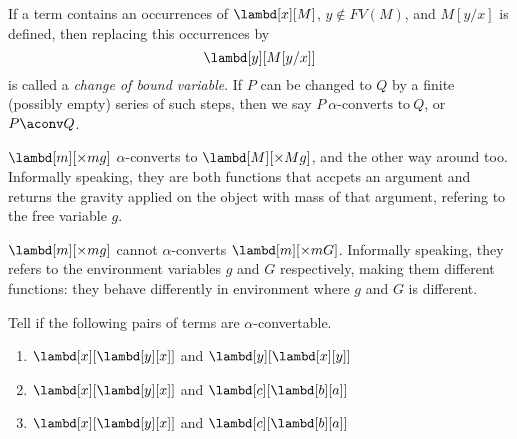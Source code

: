 \documentclass[../../../include/open-logic-section]{subfiles}
\begin{document}

\begin{defn}
  If a term contains an occurrences of $\lambd[x][M]$, $y \notin
  FV(M)$, and $M[y/x]$ is defined, then replacing this occurrences
  by 
  \begin{equation*}
    \lambd[y][M[y/x]]
  \end{equation*}
  is called a \emph{change of bound
    variable}. If $P$ can be changed to $Q$ by a finite (possibly
  empty) series of such steps, then we say $P ~\alpha\text{-converts to}~ Q$,
  or $P \aconv Q$.
\end{defn}

\begin{ex}
  $\lambd[m][\times m g]$ $\alpha$-converts to $\lambd[M][\times M
  g]$, and the other way around too. Informally
  speaking, they are both functions that accpets an argument and
  returns the gravity applied on the object with mass of that argument,
  refering to the free variable $g$.
\end{ex}
\begin{ex}
  $\lambd[m][\times m g]$ cannot $\alpha$-converts $\lambd[m][\times m
  G]$. Informally speaking, they refers to the environment variables $g$ and $G$ respectively,
  making them different functions: they behave differently in
  environment where $g$ and $G$ is different.
\end{ex}

\begin{prob}
  Tell if the following pairs of terms are $\alpha$-convertable.
  \begin{enumerate}
  \item $\lambd[x][\lambd[y][x]]$ and $\lambd[y][\lambd[x][y]]$
  \item $\lambd[x][\lambd[y][x]]$ and $\lambd[c][\lambd[b][a]]$
  \item $\lambd[x][\lambd[y][x]]$ and $\lambd[c][\lambd[b][a]]$
  \end{enumerate}
\end{prob}
\end{document}
